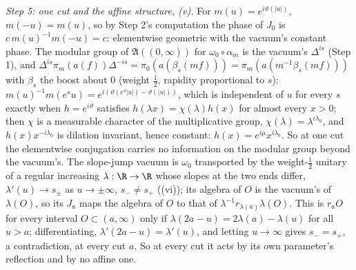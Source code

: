 \emph{Step 5: one cut and the affine structure, (v).} For $m(u) = e^{i\vartheta(|u|)}$, $m(-u) = m(u)$, so by Step 2's computation the phase of $J_{0}$ is $c\,m(u)^{-1}m(-u) = c$: elementwise geometric with the vacuum's constant phase. The modular group of $\mathfrak{A}((0, \infty))$ for $\omega_{0}\circ\alpha_{m}$ is the vacuum's $\Delta^{is}$ (Step 1), and $\Delta^{is}\pi_{m}(a(f))\Delta^{-is} = \pi_{0}(a(\beta_{s}(mf))) = \pi_{m}(a(m^{-1}\beta_{s}(mf)))$ with $\beta_{s}$ the boost about $0$ (weight $\tfrac12$, rapidity proportional to $s$): $m(u)^{-1}m(e^{s}u) = e^{i(\vartheta(e^{s}|u|) - \vartheta(|u|))}$, which is independent of $u$ for every $s$ exactly when $h = e^{i\vartheta}$ satisfies $h(\lambda x) = \chi(\lambda)h(x)$ for almost every $x > 0$; then $\chi$ is a measurable character of the multiplicative group, $\chi(\lambda) = \lambda^{i\lambda_{0}}$, and $h(x)x^{-i\lambda_{0}}$ is dilation invariant, hence constant: $h(x) = e^{i\mu}x^{i\lambda_{0}}$. So at one cut the elementwise conjugation carries no information on the modular group beyond the vacuum's. The slope-jump vacuum is $\omega_{0}$ transported by the weight-$\tfrac12$ unitary of a regular increasing $\lambda : \R \to \R$ whose slopes at the two ends differ, $\lambda'(u) \to s_{\pm}$ as $u \to \pm\infty$, $s_{-} \neq s_{+}$ ((vi)); its algebra of $O$ is the vacuum's of $\lambda(O)$, so its $J_{a}$ maps the algebra of $O$ to that of $\lambda^{-1}r_{\lambda(a)}\lambda(O)$. This is $r_{a}O$ for every interval $O \subset (a, \infty)$ only if $\lambda(2a - u) = 2\lambda(a) - \lambda(u)$ for all $u > a$; differentiating, $\lambda'(2a - u) = \lambda'(u)$, and letting $u \to \infty$ gives $s_{-} = s_{+}$, a contradiction, at every cut $a$. So at every cut it acts by its own parameter's reflection and by no affine one.

